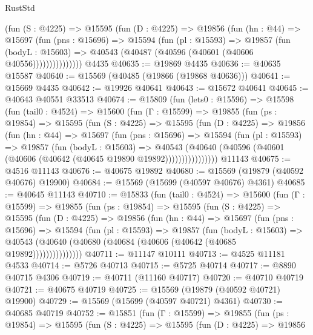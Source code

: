 \begin{lexlean}{RustStd}
\begin{coremodule}
              (fun (S : @4225) =>
              @15595
                (fun (D : @4225) =>
                @19856
                  (fun (hn : @44) =>
                  @15697
                    (fun (pns : @15696) =>
                    @15594
                      (fun (pl : @15593) =>
                      @19857
                        (fun (bodyL : @15603) =>
                        @40543 (@40487 (@40596 (@40601 (@40606 @40556)))))))))))))))
    @4435
@40635 := @19869 @4435
@40636 := @40635 @15587
@40640 := @15569 (@40485 (@19866 (@19868 @40636)))
@40641 := @15669 @4435
@40642 := @19926 @40641
@40643 := @15672 @40641
@40645 := @40643 @40551 @33513
@40674 := @15809
    (fun (lets0 : @15596) =>
    @15598
      (fun (tail0 : @4524) =>
      @15600
        (fun (Γ : @15599) =>
        @19855
          (fun (ps : @19854) =>
          @15595
            (fun (S : @4225) =>
            @15595
              (fun (D : @4225) =>
              @19856
                (fun (hn : @44) =>
                @15697
                  (fun (pns : @15696) =>
                  @15594
                    (fun (pl : @15593) =>
                    @19857
                      (fun (bodyL : @15603) =>
                      @40543
                        (@40640
                          (@40596 (@40601 (@40606 (@40642 (@40645 @19890 @19892))))))))))))))))
    @11143
@40675 := @4516 @11143
@40676 := @40675 @19892
@40680 := @15569 (@19879 (@40592 @40676) @19900)
@40684 := @15569 (@15699 (@40597 @40676) @4361)
@40685 := @40645 @11143
@40710 := @15833
    (fun (tail0 : @4524) =>
    @15600
      (fun (Γ : @15599) =>
      @19855
        (fun (ps : @19854) =>
        @15595
          (fun (S : @4225) =>
          @15595
            (fun (D : @4225) =>
            @19856
              (fun (hn : @44) =>
              @15697
                (fun (pns : @15696) =>
                @15594
                  (fun (pl : @15593) =>
                  @19857
                    (fun (bodyL : @15603) =>
                    @40543 (@40640 (@40680 (@40684 (@40606 (@40642 (@40685 @19892)))))))))))))))
@40711 := @11147 @10111
@40713 := @4525 @11181 @4533
@40714 := @5726 @40713
@40715 := @5725 @40714
@40717 := @8890 @40715 @4306
@40719 := @40711 (@11160 @40717)
@40720 := @40710 @40719
@40721 := @40675 @40719
@40725 := @15569 (@19879 (@40592 @40721) @19900)
@40729 := @15569 (@15699 (@40597 @40721) @4361)
@40730 := @40685 @40719
@40752 := @15851
    (fun (Γ : @15599) =>
    @19855
      (fun (ps : @19854) =>
      @15595
        (fun (S : @4225) =>
        @15595
          (fun (D : @4225) =>
          @19856

\end{coremodule}
\end{lexlean}
